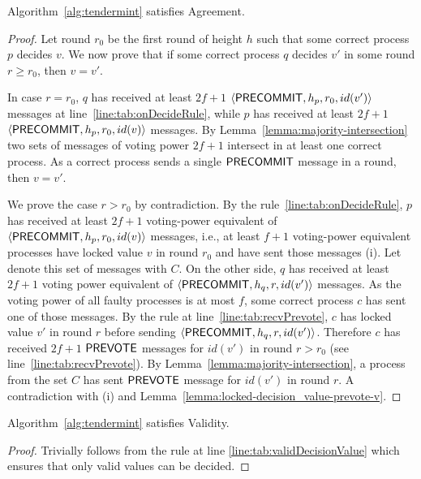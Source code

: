 \begin{lemma} \label{lemma:agreement} Algorithm~\ref{alg:tendermint} satisfies
Agreement.  \end{lemma}

\begin{proof} Let round $r_0$ be the first round of height $h$ such that some
    correct process $p$ decides $v$. We now prove that if some correct process
    $q$ decides $v'$ in some round $r \ge r_0$, then $v = v'$.

In case $r = r_0$, $q$ has received at least $2f+1$
$\langle\mathsf{PRECOMMIT},h_p,r_0,id(v')\rangle$  messages at line~\ref{line:tab:onDecideRule},
while $p$ has received at least $2f+1$ $\langle\mathsf{PRECOMMIT},h_p,r_0,id(v)\rangle$
messages.  By Lemma~\ref{lemma:majority-intersection} two sets of messages of
voting power $2f+1$ intersect in at least one correct process.  As a correct
process sends a single $\mathsf{PRECOMMIT}$ message in a round, then $v=v'$.

We prove the case $r > r_0$ by contradiction. By the
rule~\ref{line:tab:onDecideRule}, $p$ has received at least $2f+1$ voting-power
equivalent of $\langle\mathsf{PRECOMMIT},h_p,r_0,id(v)\rangle$ messages, i.e., at least $f+1$
voting-power equivalent processes have locked value $v$ in round $r_0$ and have
sent those messages (i). Let denote this set of messages with $C$.  On the
other side, $q$ has received at least $2f+1$ voting power equivalent of
$\langle\mathsf{PRECOMMIT},h_q, r,id(v')\rangle$ messages. As the voting power of all faulty
processes is at most $f$, some correct process $c$ has sent one of those
messages. By the rule at line~\ref{line:tab:recvPrevote}, $c$ has locked value
$v'$ in round $r$ before sending $\langle\mathsf{PRECOMMIT},h_q, r,id(v')\rangle$. Therefore $c$
has received $2f+1$ $\mathsf{PREVOTE}$ messages for $id(v')$ in round $r > r_0$ (see
line~\ref{line:tab:recvPrevote}). By Lemma~\ref{lemma:majority-intersection}, a
process from the set $C$ has sent $\mathsf{PREVOTE}$ message for $id(v')$ in round $r$.
A contradiction with (i) and Lemma~\ref{lemma:locked-decision_value-prevote-v}.
\end{proof}	

\begin{lemma} \label{lemma:agreement} Algorithm~\ref{alg:tendermint} satisfies
Validity.  \end{lemma}

\begin{proof} Trivially follows from the rule at line
\ref{line:tab:validDecisionValue} which ensures that only valid values can be
decided.  \end{proof}	

